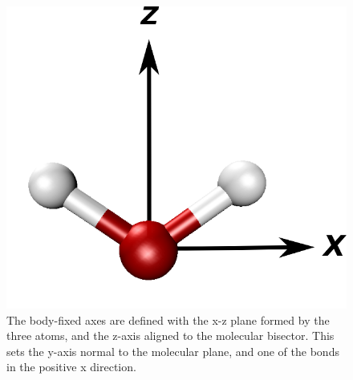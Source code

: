 \begin{figure}[h!]
	\begin{center}
		\includegraphics[scale=1.0]{images/angle-cartoons/molecularframesmall.png}
		\caption{The body-fixed axes are defined with the x-z plane formed by the three atoms, and the z-axis aligned to the molecular bisector. This sets the y-axis normal to the molecular plane, and one of the bonds in the positive x direction.}
		\label{fig:molecular-frame}
	\end{center}
\end{figure}

